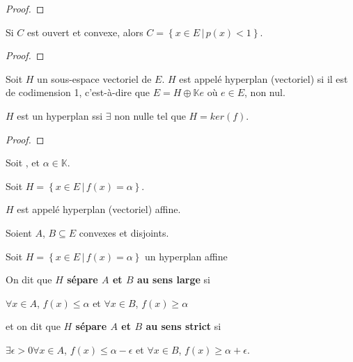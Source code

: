 \begin{proof}
	
\end{proof}

\begin{proposition}
	Si $C$ est ouvert et convexe, alors $C = \left\{x \in E \, | \, p(x) <
	1\right\}$.
\end{proposition}

\begin{proof}
	
\end{proof}

\begin{definition} [Hyperplan]
	Soit $H$ un sous-espace vectoriel de $E$. $H$ est appelé hyperplan
	(vectoriel) si il est de codimension 1, c'est-à-dire que $E = H\oplus
	\mathbb{K}e$ où $e \in E$, non nul.
\end{definition}

\begin{proposition}
	$H$ est un hyperplan ssi $\exists$  non nulle
	tel que $H = ker(f)$.
\end{proposition}

\begin{proof}
	
\end{proof}

\begin{definition} 
	Soit , et $\alpha \in \mathbb{K}$.
	
	Soit $H = \left\{ x \in E \, | \, f(x) = \alpha \right\}$.

	$H$ est appelé hyperplan (vectoriel) affine.
\end{definition}


\begin{definition}
	Soient $A$, $B \subseteq E$ convexes et disjoints.
	
	Soit $H = \left\{ x \in E \, | \, f(x) = \alpha\right\}$ un hyperplan affine

	On dit que \textbf{$H$ sépare $A$ et $B$ au sens large} si

	$\forall x \in A$, $f(x) \leq \alpha$ et $\forall x \in B$, $f(x) \geq
	\alpha$

	et on dit que \textbf{$H$ sépare $A$ et $B$ au sens strict} si

	$\exists \epsilon > 0 \forall x \in A$, $f(x) \leq \alpha -
	\epsilon$ et $\forall x \in B$, $f(x) \geq \alpha + \epsilon$.

\end{definition}


